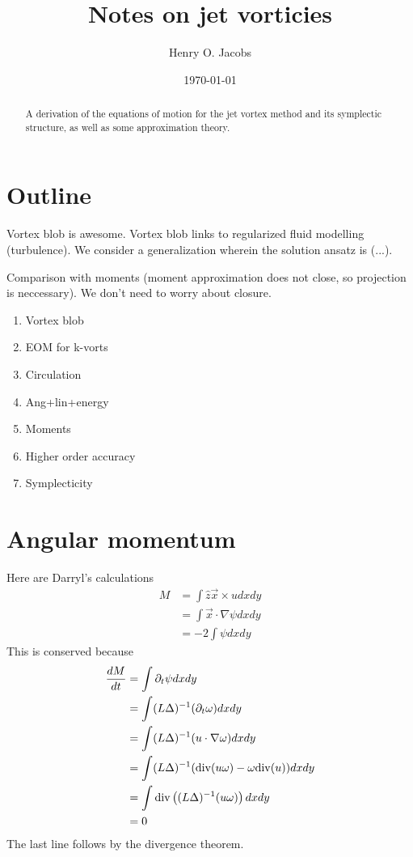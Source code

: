 \documentclass[12pt]{amsart}
\title{Notes on jet vorticies}
\author{Henry O. Jacobs}
\date{\today}
\begin{document}
\maketitle

\begin{abstract}
  A derivation of the equations of motion for the jet vortex method
  and its symplectic structure, as well as some approximation theory.
\end{abstract}

\section{Outline}

Vortex blob is awesome.
Vortex blob links to regularized fluid modelling (turbulence).
We consider a generalization wherein the solution ansatz is (...).

Comparison with moments (moment approximation does not close, so projection is neccessary).  We don't need to worry about closure.

\begin{enumerate}
\item Vortex blob
\item EOM for k-vorts
\item Circulation
\item Ang+lin+energy
\item Moments
\item Higher order accuracy
\item Symplecticity
\end{enumerate}


\section{Angular momentum}
\label{sec:angular_momentum}
Here are Darryl's calculations
\begin{align*}
  M &= \int \hat{z} \vec{x} \times u dx dy \\
  &= \int \vec{x} \cdot \nabla \psi dx dy \\
  &= -2 \int \psi dx dy 
\end{align*}
This is conserved because
\begin{align*}
  \frac{dM}{dt} &= \int \partial_t \psi dx dy\\
  &= \int (L\Delta)^{-1} (\partial_t \omega) dx dy \\
  &= \int (L \Delta)^{-1} ( u \cdot \nabla \omega) dx dy \\
  &= \int (L \Delta)^{-1} ( {\rm div}( u \omega) - \omega {\rm div}(u) ) dxdy \\
  &= \int {\rm div} \left( (L\Delta)^{-1}( u \omega) \right) dx dy \\
   &= 0
\end{align*}
The last line follows by the divergence theorem.
\end{document}
